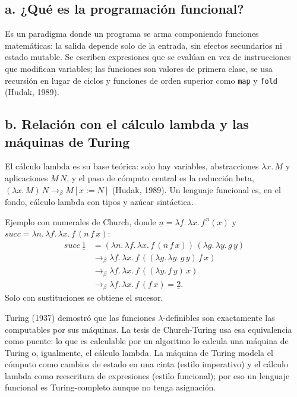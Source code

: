 \documentclass[11pt,letterpaper]{article}
\begin{document}
\subsection*{a. ¿Qué es la programación funcional?}

Es un paradigma donde un programa se arma componiendo funciones matemáticas: la salida depende solo de la entrada, sin efectos secundarios ni estado mutable. Se escriben expresiones que se evalúan en vez de instrucciones que modifican variables; las funciones son valores de primera clase, se usa recursión en lugar de ciclos y funciones de orden superior como \texttt{map} y \texttt{fold} (Hudak, 1989).

\subsection*{b. Relación con el cálculo lambda y las máquinas de Turing}

El cálculo lambda es su base teórica: solo hay variables, abstracciones $\lambda x.\,M$ y aplicaciones $M\,N$, y el paso de cómputo central es la reducción beta, $(\lambda x.\,M)\,N \to_\beta M[x := N]$ (Hudak, 1989). Un lenguaje funcional es, en el fondo, cálculo lambda con tipos y azúcar sintáctica.

Ejemplo con numerales de Church, donde $\underline{n} = \lambda f.\,\lambda x.\,f^{\,n}(x)$ y $\mathit{succ} = \lambda n.\,\lambda f.\,\lambda x.\,f\,(n\,f\,x)$:
\begin{align*}
\mathit{succ}\ \underline{1}
&= (\lambda n.\,\lambda f.\,\lambda x.\,f\,(n\,f\,x))\,(\lambda g.\,\lambda y.\,g\,y)\\
&\to_\beta \lambda f.\,\lambda x.\,f\,((\lambda g.\,\lambda y.\,g\,y)\,f\,x)\\
&\to_\beta \lambda f.\,\lambda x.\,f\,((\lambda y.\,f\,y)\,x)\\
&\to_\beta \lambda f.\,\lambda x.\,f\,(f\,x) = \underline{2}.
\end{align*}
Solo con sustituciones se obtiene el sucesor.

Turing (1937) demostró que las funciones $\lambda$-definibles son exactamente las computables por sus máquinas. La tesis de Church-Turing usa esa equivalencia como puente: lo que es calculable por un algoritmo lo calcula una máquina de Turing o, igualmente, el cálculo lambda. La máquina de Turing modela el cómputo como cambios de estado en una cinta (estilo imperativo) y el cálculo lambda como reescritura de expresiones (estilo funcional); por eso un lenguaje funcional es Turing-completo aunque no tenga asignación.
\end{document}
